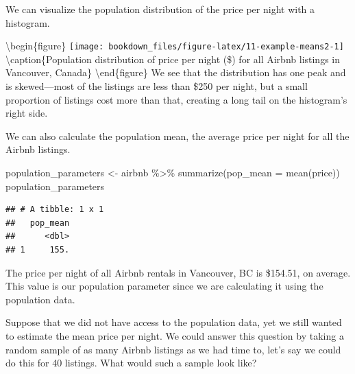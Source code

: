 \documentclass[
]{krantz}
\makeatletter
\newenvironment{Shaded}{\begin{snugshade}}{\end{snugshade}}
\newcommand{\AttributeTok}[1]{\textcolor[rgb]{0.61,0.61,0.61}{#1}}
\newcommand{\FunctionTok}[1]{\textcolor[rgb]{0,0,0}{#1}}
\newcommand{\NormalTok}[1]{#1}
\newcommand{\OtherTok}[1]{\textcolor[rgb]{0.37,0.37,0.37}{#1}}
\newcommand{\SpecialCharTok}[1]{\textcolor[rgb]{0,0,0}{#1}}
\newcommand{\StringTok}[1]{\textcolor[rgb]{0.5,0.5,0.5}{#1}}
\newenvironment{kframe}{%
\medskip{}
\setlength{\fboxsep}{.8em}
 \def\at@end@of@kframe{}%
 \ifinner\ifhmode%
  \def\at@end@of@kframe{\end{minipage}}%
  \begin{minipage}{\columnwidth}%
 \fi\fi%
 \def\FrameCommand##1{\hskip\@totalleftmargin \hskip-\fboxsep
 \colorbox{shadecolor}{##1}\hskip-\fboxsep
     \hskip-\linewidth \hskip-\@totalleftmargin \hskip\columnwidth}%
 \MakeFramed {\advance\hsize-\width
   \@totalleftmargin\z@ \linewidth\hsize
   \@setminipage}}%
 {\par\unskip\endMakeFramed%
 \at@end@of@kframe}
\renewenvironment{Shaded}{\begin{kframe}}{\end{kframe}}
\makeatother
\begin{document}
We can visualize the population distribution of the price per night with a histogram.

\begin{Shaded}
\end{Shaded}

\textbackslash begin\{figure\}
\texttt{[image: bookdown\_files/figure-latex/11-example-means2-1]} \textbackslash caption\{Population distribution of price per night (\$) for all Airbnb listings in Vancouver, Canada\}\label{fig:11-example-means2}
\textbackslash end\{figure\}
We see that the distribution has one peak and is skewed---most of the listings
are less than \$250 per night, but a small proportion of listings cost more
than that, creating a long tail on the histogram's right side.

We can also calculate the population mean, the average price per night for all the Airbnb listings.

\begin{Shaded}
\begin{Highlighting}[]
\NormalTok{population\_parameters }\OtherTok{\textless{}{-}}\NormalTok{ airbnb }\SpecialCharTok{\%\textgreater{}\%}
  \FunctionTok{summarize}\NormalTok{(}\AttributeTok{pop\_mean =} \FunctionTok{mean}\NormalTok{(price))}
\NormalTok{population\_parameters}
\end{Highlighting}
\end{Shaded}

\begin{verbatim}
## # A tibble: 1 x 1
##   pop_mean
##      <dbl>
## 1     155.
\end{verbatim}

The price per night of all Airbnb rentals in Vancouver, BC is \$154.51, on average. This value is our population parameter since we are calculating it using the population data.

Suppose that we did not have access to the population data, yet we still wanted to estimate the mean price per night. We could answer this question by taking a random sample of as many Airbnb listings as we had time to, let's say we could do this for 40 listings. What would such a sample look like?
\end{document}
